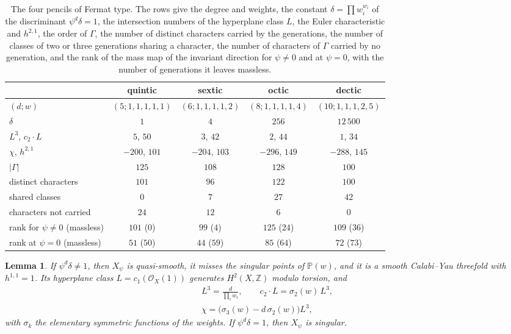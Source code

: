 \documentclass[11pt]{amsart}
\newtheorem{lemma}[theorem]{Lemma}
\theoremstyle{definition}
\theoremstyle{remark}
\newcommand{\Z}{\mathbb{Z}}
\newcommand{\PP}{\mathbb{P}}
\newcommand{\cO}{\mathcal{O}}
\begin{document}
\begin{table}[t]
\caption{The four pencils of Fermat type. The rows give the degree and
weights, the constant $\delta=\prod w_i^{w_i}$ of the discriminant
$\psi^d\delta=1$, the intersection numbers of the hyperplane class $L$, the
Euler characteristic and $h^{2,1}$, the order of $\Gamma$, the number of
distinct characters carried by the generations, the number of classes of
two or three generations sharing a character, the number of characters of
$\Gamma$ carried by no generation, and the rank of the mass map of the
invariant direction for $\psi\ne0$ and at $\psi=0$, with the number of
generations it leaves massless.}
\label{tab:wdata}
\centering
\begin{tabular}{lcccc}
\toprule
 & quintic & sextic & octic & dectic\\
\midrule
$(d;w)$ & $(5;1,1,1,1,1)$ & $(6;1,1,1,1,2)$ & $(8;1,1,1,1,4)$ & $(10;1,1,1,2,5)$\\
$\delta$ & $1$ & $4$ & $256$ & $12\,500$\\
$L^3$, $c_2\cdot L$ & $5$, $50$ & $3$, $42$ & $2$, $44$ & $1$, $34$\\
$\chi$, $h^{2,1}$ & $-200$, $101$ & $-204$, $103$ & $-296$, $149$ & $-288$, $145$\\
$|\Gamma|$ & $125$ & $108$ & $128$ & $100$\\
distinct characters & $101$ & $96$ & $122$ & $100$\\
shared classes & $0$ & $7$ & $27$ & $42$\\
characters not carried & $24$ & $12$ & $6$ & $0$\\
rank for $\psi\ne0$ (massless) & $101$ ($0$) & $99$ ($4$) & $125$ ($24$) & $109$ ($36$)\\
rank at $\psi=0$ (massless) & $51$ ($50$) & $44$ ($59$) & $85$ ($64$) & $72$ ($73$)\\
\bottomrule
\end{tabular}
\end{table}

\begin{lemma}\label{lem:wsmooth}
If $\psi^d\delta\ne1$, then $X_\psi$ is quasi-smooth, it misses the singular
points of $\PP(w)$, and it is a smooth Calabi--Yau threefold with
$h^{1,1}=1$. Its hyperplane class $L=c_1(\cO_X(1))$ generates $H^2(X,\Z)$
modulo torsion, and
\begin{equation}\label{eq:wchern}
\begin{gathered}
L^3=\frac{d}{\prod_iw_i},\qquad c_2\cdot L=\sigma_2(w)\,L^3,\\
\chi=\big(\sigma_3(w)-d\,\sigma_2(w)\big)L^3,
\end{gathered}
\end{equation}
with $\sigma_k$ the elementary symmetric functions of the weights. If
$\psi^d\delta=1$, then $X_\psi$ is singular.
\end{lemma}
\end{document}
